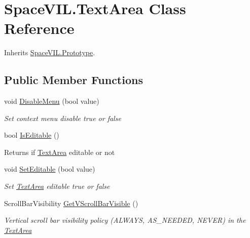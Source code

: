 \hypertarget{class_space_v_i_l_1_1_text_area}{}\section{Space\+V\+I\+L.\+Text\+Area Class Reference}
\label{class_space_v_i_l_1_1_text_area}


Inherits \mbox{\hyperlink{class_space_v_i_l_1_1_prototype}{Space\+V\+I\+L.\+Prototype}}.

\subsection*{Public Member Functions}
\begin{DoxyCompactItemize}
\item 
void \mbox{\hyperlink{class_space_v_i_l_1_1_text_area_a7089fae13c670a2f47a6f188e5f5f1ee}{Disable\+Menu}} (bool value)
\begin{DoxyCompactList}\small\item\em Set context menu disable true or false \end{DoxyCompactList}\item 
\mbox{\label{class_space_v_i_l_1_1_text_area_ab0b47e2b62afb0441e91b422a071fa74}} 
bool \mbox{\hyperlink{class_space_v_i_l_1_1_text_area_ab0b47e2b62afb0441e91b422a071fa74}{Is\+Editable}} ()
\begin{DoxyCompactList}\small\item\em \begin{DoxyReturn}{Returns}
if \mbox{\hyperlink{class_space_v_i_l_1_1_text_area}{Text\+Area}} editable or not 
\end{DoxyReturn}
\end{DoxyCompactList}\item 
void \mbox{\hyperlink{class_space_v_i_l_1_1_text_area_aace48f2c2e10b98336dc0a06d85e3b9f}{Set\+Editable}} (bool value)
\begin{DoxyCompactList}\small\item\em Set \mbox{\hyperlink{class_space_v_i_l_1_1_text_area}{Text\+Area}} editable true or false \end{DoxyCompactList}\item 
Scroll\+Bar\+Visibility \mbox{\hyperlink{class_space_v_i_l_1_1_text_area_a431947482c1e18238219b5e14801b99f}{Get\+V\+Scroll\+Bar\+Visible}} ()
\begin{DoxyCompactList}\small\item\em Vertical scroll bar visibility policy (A\+L\+W\+A\+YS, A\+S\+\_\+\+N\+E\+E\+D\+ED, N\+E\+V\+ER) in the \mbox{\hyperlink{class_space_v_i_l_1_1_text_area}{Text\+Area}} \end{DoxyCompactList}\item 

\end{DoxyCompactItemize}
